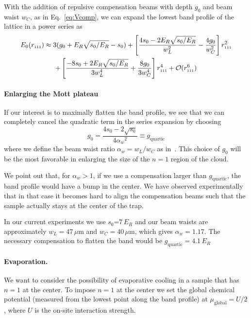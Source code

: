 \documentclass[11pt,letter]{article}
\newcommand{\rdiag}{\ensuremath{ r_{\text{\tiny{111}}} } }
\newcommand{\awaist}{\ensuremath{ \alpha_{w} }}
\begin{document}
With the addition of repulsive compensation beams with depth $g_{0}$ and beam
waist $w_{C}$,  as in Eq.~\ref{eq:Vcomp},  we can expand the lowest band
profile of the lattice in a power series as  
\begin{multline} 
  E_{0}(\rdiag)    \approx   
  3( g_{0} + E_{R}\sqrt{s_{0}/E_{R}} - s_{0} )   
  + \left[ 
    \frac{ 4s_{0} - 2E_{R}\sqrt{s_{0}/E_{R}} }{w_{L}^{2} } 
   - 
  \frac{ 4 g_{0} }{ w_{C}^{2}} \right]
  \rdiag^{2}  \\ 
  +  \left[  \frac{ - 8 s_{0} + 2E_{R}\sqrt{s_{0}/E_{R}} }{3 w_{L}^{4} } + 
    \frac{ 8 g_{0} }{3 w_{C}^{4} }  \right] \rdiag^{4}   + 
  \mathcal{O}( \rdiag^{6} )
\end{multline}  

\paragraph{Enlarging the Mott plateau} 
If our interest is to maximally flatten the band profile, we see that we can
completely cancel the quadratic term in the series expansion by choosing 
\begin{equation}
 g_{0} = \frac{  4 s_{0} - 2 \sqrt{s_{0}} }{ 4 \awaist^{2} }  
  \equiv g_{\text{quartic}} 
\end{equation}
where we define  the beam waist ratio $\awaist = w_{L}/w_{C}$ as
in~\cite{Mathy2012}.  This choice of $g_{0}$ will be the most favorable in
enlarging the size of the $n=1$ region of the cloud.
 
We point out that, for $\awaist > 1$,  if we
use a compensation larger than $g_{\text{quartic}}$, the band profile would
have a bump in the center.  We have observed experimentally that in that case
it becomes hard to align the compensation beams such that the sample actually
stays at the center of the trap.

In our current experiments we use $s_{0}$=7\,$E_{R}$ and our beam waists are
approximately $w_{L}=47\,\mu$m and $w_{C}=40\,\mu$m, which gives
$\awaist=1.17$.  The necessary compensation to flatten the band would be
$g_{\text{quartic}} =  4.1\,E_{R}$




\paragraph{Evaporation.} We want to consider the possibility of evaporative
cooling in a sample that has $n=1$ at the center.  To impose $n=1$ at the
center we set the global chemical potential (measured from the lowest point
along the band profile) at $\mu_{\text{global}} = U/2$, where $U$ is the
on-site interaction strength.   
\end{document}
